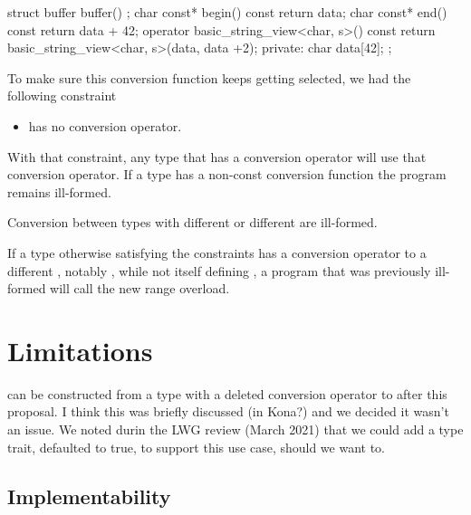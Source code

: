 \documentclass{wg21}
\begin{document}
\begin{colorblock}
struct buffer {
   buffer() {};
   char const* begin() const { return data; }
   char const* end() const { return data + 42; }
   operator basic_string_view<char, s>() const{
      return basic_string_view<char, s>(data, data +2);
   }
private:
   char data[42];
};
\end{colorblock}

To make sure this conversion function keeps getting selected, we had the following constraint

\begin{itemize}

\item {} has no  conversion operator.

\end{itemize}

With that constraint, any type that has a conversion operator will use that conversion operator.
If a  type has a non-const conversion function the program remains ill-formed.

Conversion between  types with different  or different  are ill-formed.

If a type otherwise satisfying the constraints has a conversion operator to a different ,
notably , while not itself defining , a program that was previously ill-formed will call the new range overload. 

\section{Limitations}

 can be constructed from a type with a deleted conversion operator to  after this proposal.
I think this was briefly discussed (in Kona?) and we decided it wasn't an issue.
We noted durin the LWG review (March 2021) that we could add a  type trait, defaulted to
true, to support this use case, should we want to.


\subsection{Implementability}
\end{document}
